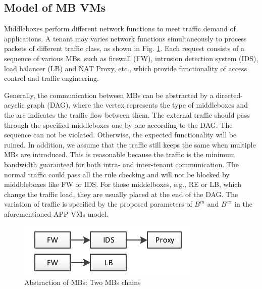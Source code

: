 \documentclass[10pt, conference, letterpaper]{IEEEtran}
\begin{document}



\subsection{Model of MB VMs}\label{sec:modelformb}

Middleboxes perform different network functions to meet traffic demand of applications. A tenant may varies network functions simultaneously to process packets of different traffic class, as shown in Fig. \ref{fig:chain}. Each request consists of a sequence of various MBs, such as firewall (FW), intrusion detection system (IDS), load balancer (LB) and NAT Proxy, etc., which provide functionality of access control and traffic engineering. 


Generally, the communication between MBs can be abstracted by a directed-acyclic graph (DAG), where the vertex represents the type of middleboxes and the arc indicates the traffic flow between them. The external traffic should pass through the specified middleboxes one by one according to the DAG. The sequence can not be violated. Otherwise, the expected functionality will be ruined. In addition, we assume that the traffic still keeps the same when multiple MBs are introduced. This is reasonable because the traffic is the minimum bandwidth guaranteed for both intra- and inter-tenant communication. The normal traffic could pass all the rule checking and will not be blocked by middbleboxes like FW or IDS. For those middelboxes, e.g., RE or LB, which change the traffic load, they are usually placed at the end of the DAG. The variation of traffic is specified by the proposed parameters of $B^{in}$ and $B^{ex}$ in the aforementioned APP VMs model.

\begin{figure}
	\centering
		\includegraphics[width=3.0 in]{fig/chain.pdf}
	\caption{Abstraction of MBs: Two MBs chains}
	\label{fig:chain}
\end{figure}
\end{document}
